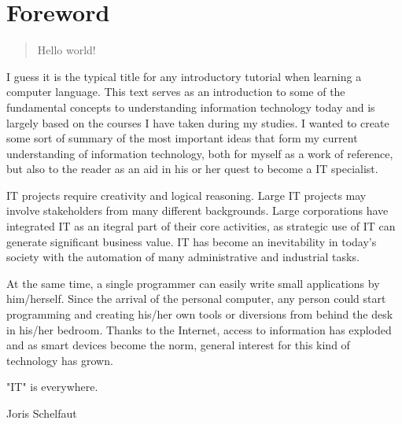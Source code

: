 \chapter*{Foreword}\label{chapter:foreword}

\begin{quote}
	Hello world!
\end{quote}

I guess it is the typical title for any introductory tutorial when learning a computer language. This text serves as an introduction to some of the fundamental concepts to understanding information technology today and is largely based on the courses I have taken during my studies. I wanted to create some sort of summary of the most important ideas that form my current understanding of information technology, both for myself as a work of reference, but also to the reader as an aid in his or her quest to become a IT specialist.

IT projects require creativity and logical reasoning. Large IT projects may involve stakeholders from many different backgrounds. Large corporations have integrated IT as an itegral part of their core activities, as strategic use of IT can generate significant business value. IT has become an inevitability in today's society with the automation of many administrative and industrial tasks.

At the same time, a single programmer can easily write small applications by him/herself. Since the arrival of the personal computer, any person could start programming and creating his/her own tools or diversions from behind the desk in his/her bedroom. Thanks to the Internet, access to information has exploded and as smart devices become the norm, general interest for this kind of technology has grown.

"IT" is everywhere.



\begin{flushright}
Joris Schelfaut
\end{flushright}